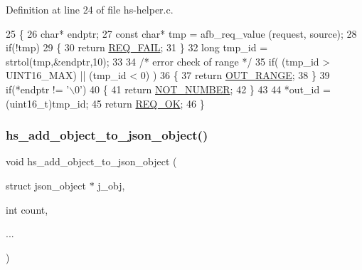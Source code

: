 Definition at line 24 of file hs-\/helper.\+c.


\begin{DoxyCode}
25 \{
26     \textcolor{keywordtype}{char}* endptr;
27     \textcolor{keyword}{const} \textcolor{keywordtype}{char}* tmp = afb\_req\_value (request, source);
28     \textcolor{keywordflow}{if}(!tmp)
29     \{
30         \textcolor{keywordflow}{return} \hyperlink{hs-helper_8h_aa49f1dbbf26f01627a5737cf43aad899a96a855966bc63045222b3dcac524cee1}{REQ\_FAIL};
31     \}
32     \textcolor{keywordtype}{long} tmp\_id = strtol(tmp,&endptr,10);
33 
34     \textcolor{comment}{/* error check of range */}
35     \textcolor{keywordflow}{if}( (tmp\_id > UINT16\_MAX) || (tmp\_id < 0) )
36     \{
37         \textcolor{keywordflow}{return} \hyperlink{hs-helper_8h_aa49f1dbbf26f01627a5737cf43aad899add1c84bf80c5f80741ee8f37fef1e12b}{OUT\_RANGE};
38     \}
39     \textcolor{keywordflow}{if}(*endptr != \textcolor{charliteral}{'\(\backslash\)0'})
40     \{
41         \textcolor{keywordflow}{return} \hyperlink{hs-helper_8h_aa49f1dbbf26f01627a5737cf43aad899aa223eed65c9bee2bf1f4cdecaf90d66a}{NOT\_NUMBER};
42     \}
43 
44     *out\_id = (uint16\_t)tmp\_id;
45     \textcolor{keywordflow}{return} \hyperlink{hs-helper_8h_aa49f1dbbf26f01627a5737cf43aad899ab093abb14c097b3b7719debb04d5e8ee}{REQ\_OK};
46 \}
\end{DoxyCode}
\mbox{\label{hs-helper_8c_a1ba31a6a94515ff1730ba0043a67d59e}} 
\subsubsection{\texorpdfstring{hs\+\_\+add\+\_\+object\+\_\+to\+\_\+json\+\_\+object()}{hs\_add\_object\_to\_json\_object()}}
{\footnotesize\ttfamily void hs\+\_\+add\+\_\+object\+\_\+to\+\_\+json\+\_\+object (\begin{DoxyParamCaption}\item[{struct json\+\_\+object $\ast$}]{j\+\_\+obj,  }\item[{int}]{count,  }\item[{}]{... }\end{DoxyParamCaption})}




